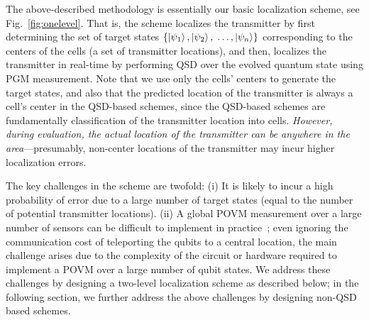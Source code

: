 The above-described methodology is essentially our basic \povmone localization scheme, see Fig.~\ref{fig:onelevel}. 
That is, the \povmone scheme localizes the transmitter by first determining the set 
of target states $\{\ket{\psi_1}, \ket{\psi_2}, $ $ \ldots, \ket{\psi_n}\}$ corresponding 
to the centers of the cells (a set of transmitter locations), and then, localizes the 
transmitter
in real-time by performing QSD over the evolved quantum state using PGM measurement.
Note that we use only the cells' centers to generate the target states, and also that
the predicted location
of the transmitter is always a cell's center in the QSD-based schemes, since the QSD-based
schemes are fundamentally classification of the transmitter location into cells.
{\em However, during evaluation, the actual
location of the transmitter can be anywhere in the area}---presumably, non-center locations 
of the transmitter may incur higher localization errors.

The key challenges in the \povmone scheme are twofold: (i) It is likely to incur a high probability
of error due to a large number of target states (equal to the number of potential 
transmitter locations). (ii) A global POVM measurement over a large number of sensors can be
difficult to implement in practice~\cite{pra19-povm}; even ignoring the communication cost of teleporting the 
qubits to a central location, the main challenge arises due to the complexity of the circuit or
hardware required  to implement a POVM over a large number of qubit states.
We address these challenges by designing a two-level localization scheme as described below; 
in the following section, we further address the above challenges by designing non-QSD based
schemes.



